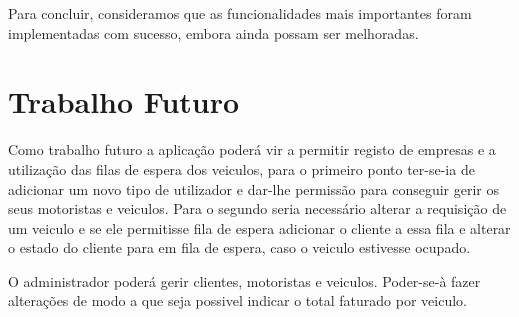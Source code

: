 Para concluir, consideramos que as funcionalidades mais importantes foram implementadas com sucesso, embora ainda possam ser melhoradas. 

\section{Trabalho Futuro}

Como trabalho futuro a aplicação poderá vir a permitir registo de empresas e a utilização das filas de espera dos veiculos, para o primeiro ponto ter-se-ia de adicionar um novo tipo de utilizador e dar-lhe permissão para conseguir gerir os seus motoristas e veiculos.  Para o segundo seria necessário alterar a requisição de um veiculo e  se ele permitisse fila de espera adicionar o cliente a essa fila e alterar o estado do cliente para em fila de espera, caso o veiculo estivesse ocupado. 

O administrador poderá gerir clientes, motoristas e veiculos. Poder-se-à fazer alterações de modo a que seja possivel indicar o total faturado por veiculo. 




